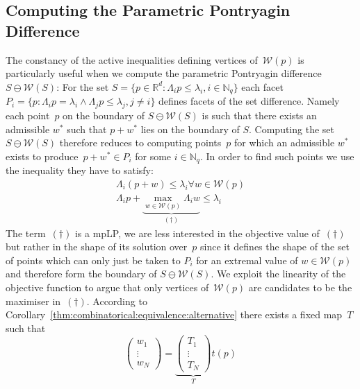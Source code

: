 \documentclass[a4paper, 12pt, twoside]{article}
\theoremstyle{definition}
\numberwithin{equation}{section}
\begin{document}
\subsection{Computing the Parametric Pontryagin Difference}\label{ssec:computation:p:pontryagin:difference}
%
%
%
The constancy of the active inequalities defining vertices of~$\mathcal W(p)$ is particularly useful when we compute the parametric Pontryagin difference $S\ominus\mathcal W(S)$:
%
For the set $S=\{p\in\mathbb R^d:\Lambda_i p\leq\lambda_i,i\in\mathbb N_q\}$ each facet $P_i=\{p:\Lambda_i p=\lambda_i\wedge\Lambda_j p\leq\lambda_j,j\neq i\}$ defines facets of the set difference.
%
Namely each point~$p$ on the boundary of $S\ominus\mathcal W(S)$ is such that there exists an admissible $w^\ast$ such that $p+w^\ast$ lies on the boundary of $S$.
%
Computing the set $S\ominus\mathcal W(S)$ therefore reduces to computing points~$p$ for which an admissible $w^\ast$ exists to produce~$p+w^\ast\in P_i$ for some $i\in\mathbb N_q$.
%
In order to find such points we use the inequality they have to satisfy:
%
\begin{equation}\begin{split}
  \Lambda_i(p+w)\leq\lambda_i\forall w\in\mathcal W(p)\\
  \Lambda_i p+\underbrace{\max_{w\in\mathcal W(p)}\Lambda_i w}_{(\dagger)}\leq\lambda_i
\end{split}\end{equation}
%
The term~$(\dagger)$ is a mpLP, we are less interested in the objective value of~$(\dagger)$ but rather in the shape of its solution over~$p$ since it defines the shape of the set of points 
which can only just be taken to $P_i$ for an extremal value of $w\in\mathcal W(p)$ and therefore form the boundary of $S\ominus \mathcal W(S)$.
%
We exploit the linearity of the objective function to argue that only vertices of~$\mathcal W(p)$ are candidates to be the maximiser in~$(\dagger)$.
%
According to Corollary~\ref{thm:combinatorical:equivalence:alternative} there exists a fixed map~$T$ such that 
%
\begin{equation}
  \begin{pmatrix}w_1\\ \vdots\\ w_N\end{pmatrix} = \underbrace{\begin{pmatrix}T_1\\ \vdots\\ T_N\end{pmatrix}}_T t(p)
\end{equation}
\end{document}
